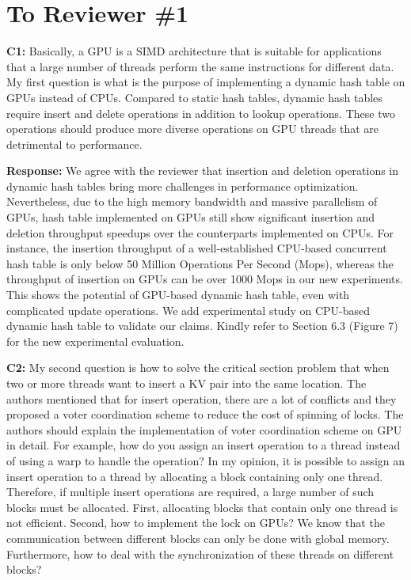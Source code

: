 \section*{To Reviewer \#1}

\begin{shaded}
	\noindent\textbf{C1:} Basically, a GPU is a SIMD architecture that is suitable for applications that a large number of threads perform the same instructions for different data. My first question is what is the purpose of implementing a dynamic hash table on GPUs instead of CPUs. Compared to static hash tables, dynamic hash tables require insert and delete operations in addition to lookup operations. These two operations should produce more diverse operations on GPU threads that are detrimental to performance.
\end{shaded}
%
\noindent\textbf{Response:} 
We agree with the reviewer that insertion and deletion operations in dynamic hash tables bring more 
challenges in performance optimization. Nevertheless, due to the high memory bandwidth and massive parallelism of GPUs, hash table implemented on GPUs still show significant insertion and deletion throughput speedups over the counterparts implemented on CPUs. For instance, the insertion throughput of a well-established CPU-based concurrent hash table \cite{li2014algorithmic} is only below 50 Million Operations Per Second (Mops), whereas the throughput of insertion on GPUs can be over 1000 Mops in our new experiments. This shows the potential of GPU-based dynamic hash table, even with complicated update operations. We add experimental study on CPU-based dynamic hash table to validate our claims. Kindly refer to Section 6.3 (Figure 7) for the new experimental evaluation. 

\begin{shaded}
	\noindent\textbf{C2:} My second question is how to solve the critical section problem that when two or more threads want to insert a KV pair into the same location. The authors mentioned that for insert operation, there are a lot of conflicts and they proposed a voter coordination scheme to reduce the cost of spinning of locks. The authors should explain the implementation of voter coordination scheme on GPU in detail. For example, how do you assign an insert operation to a thread instead of using a warp to handle the operation? In my opinion, it is possible to assign an insert operation to a thread by allocating a block containing only one thread. Therefore, if multiple insert operations are required, a large number of such blocks must be allocated. First, allocating blocks that contain only one thread is not efficient. Second, how to implement the lock on GPUs? We know that the communication between different blocks can only be done with global memory. Furthermore, how to deal with the synchronization of these threads on different blocks? 
\end{shaded}

